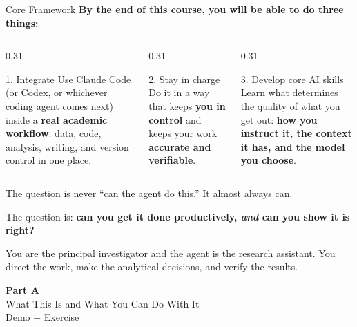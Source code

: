 \documentclass[aspectratio=169, 11pt]{beamer}
\begin{document}
\begin{frame}{Core Framework}
  \textbf{By the end of this course, you will be able to do three things:}

  \vspace{0.6em}
  \begin{columns}[T]
    \begin{column}{0.31\textwidth}
      \begin{alertblock}{1. Integrate}
        \small Use Claude Code (or Codex, or whichever coding agent comes next) inside a \textbf{real academic workflow}: data, code, analysis, writing, and version control in one place.
      \end{alertblock}
    \end{column}
    \begin{column}{0.31\textwidth}
      \begin{alertblock}{2. Stay in charge}
        \small Do it in a way that keeps \textbf{you in control} and keeps your work \textbf{accurate and verifiable}.
      \end{alertblock}
    \end{column}
    \begin{column}{0.31\textwidth}
      \begin{alertblock}{3. Develop core AI skills}
        \small Learn what determines the quality of what you get out: \textbf{how you instruct it, the context it has, and the model you choose}.
      \end{alertblock}
    \end{column}
  \end{columns}

  \vspace{0.8em}
  The question is never ``can the agent do this.'' It almost always can.

  \vspace{0.3em}
  The question is: \textbf{can you get it done productively, \emph{and} can you show it is right?}

  \vspace{0.5em}
  {\small You are the principal investigator and the agent is the research assistant. You direct the work, make the analytical decisions, and verify the results.}
\end{frame}


\begin{frame}[plain]
  \centering
  \vfill
  {\Large\textbf{Part A}}\\[0.5em]
  {\large What This Is and What You Can Do With It}\\[0.3em]
  {\small Demo + Exercise}
  \vfill
\end{frame}
\end{document}
